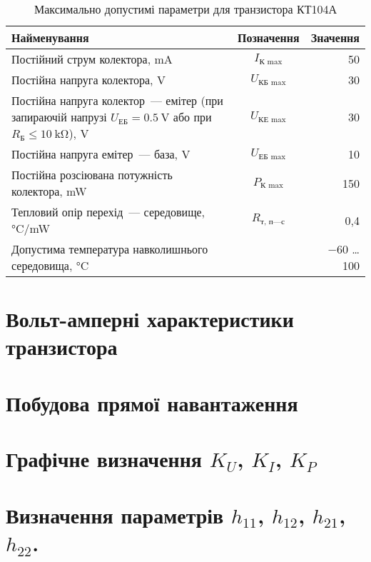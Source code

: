 \documentclass[ukrainian,utf8,nocolumnsxix,nocolumnxxxi,nocolumnxxxii]{eskdtext}
\let\stdsection\section
\renewcommand\section{\newpage\stdsection}
\begin{document}
			\begin{center}
			\begin{longtable}{|x{0.5\textwidth}|c|r|}
				\caption{Максимально допустимі параметри для транзистора КТ104А}
				\label{tab:ktmaxparams}\\
				\hline
					Найменування & Позначення & Значення \\
				\hline
				\endhead
					Постійний струм колектора, \si{\milli\ampere} & $I_{\text{К max}}$ & 50 \\
					\hline
					Постійна напруга колектора, \si{\volt} & $U_{\text{КБ max}}$ & 30 \\
					\hline
					Постійна напруга колектор~--- емітер (при запираючій напрузі $U_{\text{ЕБ}} = \SI{0,5}{\volt}$ або при $R_{\text{Б}} \leqslant \SI{10}{\kilo\ohm}$), \si{\volt} & $U_{\text{КЕ max}}$ & 30 \\
					\hline
					Постійна напруга емітер~--- база, \si{\volt} & $U_{\text{ЕБ max}}$ & 10 \\
					\hline
					Постійна розсіювана потужність колектора, \si{\milli\watt} & $P_{\text{К max}}$ & 150 \\
					\hline
					Тепловий опір перехід~--- середовище, \si[per-mode = symbol, bracket-unit-denominator = false]{\celsius\per\milli\watt} & $R_{\text{т, п—с}}$ & 0{,}4 \\
					\hline
					Допустима температура навколишнього середовища, \si{\celsius} & & \num{-60} \ldots \num{+100} \\
				\hline
			\end{longtable}
			\end{center}
			
	\section{Вольт-амперні характеристики транзистора}
	
	\section{Побудова прямої навантаження}
	
	\section{Графічне визначення $K_U$, $K_I$, $K_P$}
	
	\section{Визначення параметрів $h_{11}$, $h_{12}$, $h_{21}$, $h_{22}$.}
	
	
	\tableofcontents
	
\end{document}
